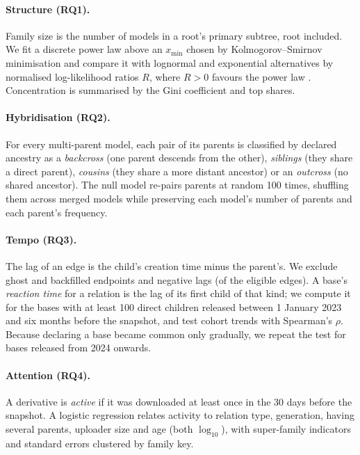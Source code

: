 \documentclass[11pt]{article}
\newcommand{\RQ}[1]{\textbf{RQ#1}}
\begin{document}
\paragraph{Structure (\RQ1).} Family size is the number of models in a root's primary subtree, root included. We fit a discrete power law above an $x_{\min}$ chosen by Kolmogorov--Smirnov minimisation and compare it with lognormal and exponential alternatives by normalised log-likelihood ratios $R$, where $R>0$ favours the power law \citep{clauset2009,alstott2014}. Concentration is summarised by the Gini coefficient and top shares.

\paragraph{Hybridisation (\RQ2).} For every multi-parent model, each pair of its parents is classified by declared ancestry as a \emph{backcross} (one parent descends from the other), \emph{siblings} (they share a direct parent), \emph{cousins} (they share a more distant ancestor) or an \emph{outcross} (no shared ancestor). The null model re-pairs parents at random 100 times, shuffling them across merged models while preserving each model's number of parents and each parent's frequency.

\paragraph{Tempo (\RQ3).} The lag of an edge is the child's creation time minus the parent's. We exclude ghost and backfilled endpoints and negative lags (\pctNegLag of the \nLagEdges eligible edges). A base's \emph{reaction time} for a relation is the lag of its first child of that kind; we compute it for the \nMajorBases bases with at least 100 direct children released between 1 January 2023 and six months before the snapshot, and test cohort trends with Spearman's $\rho$. Because declaring a base became common only gradually, we repeat the test for bases released from 2024 onwards.

\paragraph{Attention (\RQ4).} A derivative is \emph{active} if it was downloaded at least once in the 30 days before the snapshot. A logistic regression relates activity to relation type, generation, having several parents, uploader size and age (both $\log_{10}$), with super-family indicators and standard errors clustered by family key.
\end{document}
